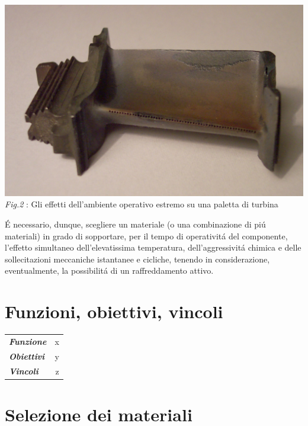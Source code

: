 \documentclass{article}
\begin{document}
    \begin{center}
        \includegraphics[width=\textwidth]{Sources/Turbinenschaufel_RB199.jpg}
        \textit{Fig.2 }: Gli effetti dell'ambiente operativo estremo su una paletta di turbina \autocite*{turbine_blade}
         \label{fig:paletta_logorata}
    \end{center}
    É necessario, dunque, scegliere un materiale (o una combinazione di piú materiali)
    in grado di sopportare, per il tempo di operativitá del componente, l'effetto
    simultaneo dell'elevatissima temperatura, dell'aggressivitá chimica e delle sollecitazioni meccaniche istantanee e cicliche,
     tenendo in considerazione, eventualmente, la possibilitá di un raffreddamento attivo.\\

    \pagebreak




    \section{Funzioni, obiettivi, vincoli\label{funz_vinc_ob}}
        \begin{tabular}{l|r}
            \toprule
                \textbf{\textit{Funzione}}   & x\\
                \textbf{\textit{Obiettivi}}  & y\\ 
                \textbf{\textit{Vincoli}}    & z\\ 
            \bottomrule
        \end{tabular}   
        \pagebreak


    \pagebreak


    \pagebreak

    \section{Selezione dei materiali\label{material_selection}}
\end{document}
